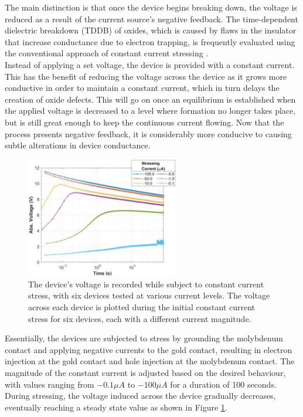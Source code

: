 \noindent The main distinction is that once the device begins breaking down, the voltage is reduced as a result of the current source's negative feedback. The time-dependent dielectric breakdown (TDDB) of oxides, which is caused by flaws in the insulator that increase conductance due to electron trapping, is frequently evaluated using the conventional approach of constant current stressing \cite{1487102}. \\

\noindent Instead of applying a set voltage, the device is provided with a constant current. This has the benefit of reducing the voltage across the device as it grows more conductive in order to maintain a constant current, which in turn delays the creation of oxide defects. This will go on once an equilibrium is established when the applied voltage is decreased to a level where formation no longer takes place, but is still great enough to keep the continuous current flowing. Now that the process presents negative feedback, it is considerably more conducive to causing subtle alterations in device conductance. \\


\begin{figure}[htbp!] 
    \centering    
    \includegraphics[width=0.6\textwidth]{Chapter4/Figs/d.png}
    \caption[Response of devices to different magnitudes of stressing currents.]{The device's voltage is recorded while subject to constant current stress, with six devices tested at various current levels. The voltage across each device is plotted during the initial constant current stress for six devices, each with a different current magnitude.}
    \label{fig:4d}
    \end{figure}
    
\noindent Essentially, the devices are subjected to stress by grounding the molybdenum contact and applying negative currents to the gold contact, resulting in electron injection at the gold contact and hole injection at the molybdenum contact. The magnitude of the constant current is adjusted based on the desired behaviour, with values ranging from $-0.1\mu A$ to $-100\mu A$ for a duration of 100 seconds. During stressing, the voltage induced across the device gradually decreases, eventually reaching a steady state value as shown in Figure \ref{fig:4d}.\\

